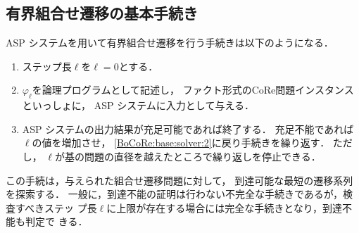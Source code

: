 \subsection{有界組合せ遷移の基本手続き} \label{sec:based_solver}

ASP システムを用いて有界組合せ遷移を行う手続きは以下のようになる．
\begin{enumerate}
\item ステップ長$\ell$を$\ell=0$とする．
\item \label{BoCoRe:base:solver:2}
  $\varphi_\ell$を論理プログラムとして記述し，
  ファクト形式のCoRe問題インスタンスといっしょに，
  ASP システムに入力として与える．
\item ASP システムの出力結果が充足可能であれば終了する．
  充足不能であれば$\ell$の値を増加させ，
  \ref{BoCoRe:base:solver:2}に戻り手続きを繰り返す．
  ただし，
  $\ell$が基の問題の直径を越えたところで繰り返しを停止できる．
\end{enumerate}
この手続は，与えられた組合せ遷移問題に対して，
到達可能な最短の遷移系列を探索する．
一般に，到達不能の証明は行わない不完全な手続きであるが，検査すべきステッ
プ長$\ell$に上限が存在する場合には完全な手続きとなり，到達不能も判定で
きる．







